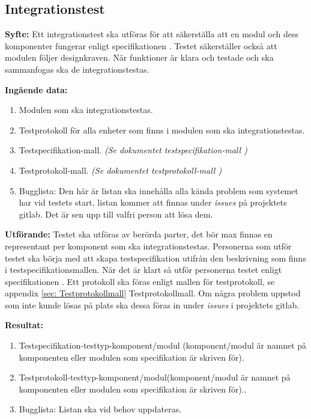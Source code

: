 \documentclass[a4paper,10pt]{article}
\begin{document}
\subsection{Integrationstest}
\label{sec:Integrationstest}
\textbf{Syfte:} Ett integrationstest ska utföras för att säkerställa att en modul och dess komponenter fungerar enligt specifikationen \cite{kravspec}. 	  Testet säkerställer också att modulen följer designkraven. När funktioner är klara och testade och ska sammanfogas ska de integrationstestas. 

\textbf{Ingående data:}
\begin{enumerate}
	\item Modulen som ska integrationstestas.
    \item Testprotokoll för alla enheter som finns i modulen som ska integrationstestas.
    \item Testspecifikation-mall. \emph{(Se dokumentet testspecifikation-mall \cite{testspec-mall})}
    \item Testprotokoll-mall. \emph{(Se dokumentet testprotokoll-mall \cite{testprot-mall})}
    \item Bugglista: Den här är listan ska innehålla alla kända problem som systemet har vid testets start, listan kommer att finnas under \emph{issues}
     på projektets gitlab. Det är sen upp till valfri person att lösa dem.
\end{enumerate}

\textbf{Utförande:} 
Testet ska utföras av berörda parter, det bör max finnas en representant per komponent som ska integrationstestas. Personerna som utför testet ska börja med att skapa testspecifikation utifrån den beskrivning som finns i testspecifikationsmallen. När det är klart så utför personerna testet enligt specifikationen \cite{kravspec}. Ett protokoll ska föras enligt mallen för testprotokoll, se appendix \ref{sec: Testprotokollmall} Testprotokollmall. Om några problem uppstod som inte kunde lösas på plats ska dessa föras in under \emph{issues} i projektets gitlab.

\textbf{Resultat:}
\begin{enumerate}
	\item \label{itm:Testspecifikation-i} Testspecifikation-testtyp-komponent/modul (komponent/modul är namnet på komponenten eller modulen som 													  specifikation är skriven för).
    \item \label{itm:Testprotokoll-i} Testprotokoll-testtyp-komponent/modul(komponent/modul är namnet på komponenten eller modulen som specifikation är 										  skriven för)..
    \item Bugglista: Listan ska vid behov uppdateras.
\end{enumerate}
\end{document}
